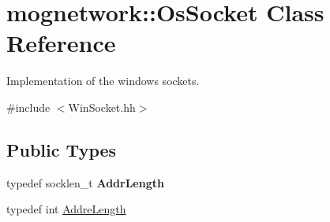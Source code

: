 \hypertarget{classmognetwork_1_1_os_socket}{\section{mognetwork\-:\-:Os\-Socket Class Reference}
\label{classmognetwork_1_1_os_socket}
}


Implementation of the windows sockets.  




{\ttfamily \#include $<$Win\-Socket.\-hh$>$}

\subsection*{Public Types}
\begin{DoxyCompactItemize}
\item 
\hypertarget{classmognetwork_1_1_os_socket_a10e453b27c0954f12f5dbf74bf9853c0}{typedef socklen\-\_\-t {\bfseries Addr\-Length}}\label{classmognetwork_1_1_os_socket_a10e453b27c0954f12f5dbf74bf9853c0}

\item 
typedef int \hyperlink{classmognetwork_1_1_os_socket_a53fd4fa9dc6b02cafdb4b7a2b6d94778}{Addre\-Length}
\end{DoxyCompactItemize}
